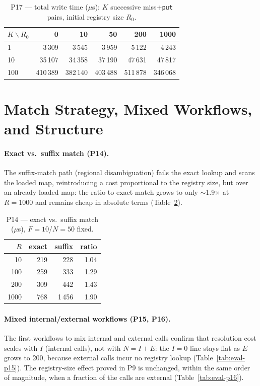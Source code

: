 \begin{table}[htbp]
  \centering
  \caption{P17 --- total write time ($\mu$s): $K$ successive miss+\texttt{put} pairs, initial
  registry size $R_0$.}
  \label{tab:eval-p17}
  \begin{tabular}{lrrrrr}
    \hline
    $K\backslash R_0$ & 0 & 10 & 50 & 200 & 1000 \\
    \hline
    1   & 3\,309   & 3\,545   & 3\,959   & 5\,122   & 4\,243   \\
    10  & 35\,107  & 34\,358  & 37\,190  & 47\,631  & 47\,817  \\
    100 & 410\,389 & 382\,140 & 403\,488 & 511\,878 & 346\,068 \\
    \hline
  \end{tabular}
\end{table}

\section{Match Strategy, Mixed Workflows, and Structure}
\label{sec:eval-secondary}

\paragraph{Exact vs.\ suffix match (P14).}
The suffix-match path (regional disambiguation) fails the exact lookup and scans the loaded map,
reintroducing a cost proportional to the registry size, but over an already-loaded map: the ratio
to exact match grows to only $\sim$1.9$\times$ at $R{=}1000$ and remains cheap in absolute terms
(Table~\ref{tab:eval-p14}).

\begin{table}[htbp]
  \centering
  \caption{P14 --- exact vs.\ suffix match ($\mu$s), $F{=}10$/$N{=}50$ fixed.}
  \label{tab:eval-p14}
  \begin{tabular}{rrrr}
    \hline
    \textbf{$R$} & \textbf{exact} & \textbf{suffix} & \textbf{ratio} \\
    \hline
    10   & 219 & 228   & 1.04 \\
    100  & 259 & 333   & 1.29 \\
    200  & 309 & 442   & 1.43 \\
    1000 & 768 & 1\,456 & 1.90 \\
    \hline
  \end{tabular}
\end{table}

\paragraph{Mixed internal/external workflows (P15, P16).}
The first workflows to mix internal and external calls confirm that resolution cost scales with
$I$ (internal calls), not with $N{=}I{+}E$: the $I{=}0$ line stays flat as $E$ grows to 200,
because external calls incur no registry lookup (Table~\ref{tab:eval-p15}). The registry-size
effect proved in P9 is unchanged, within the same order of magnitude, when a fraction of the
calls are external (Table~\ref{tab:eval-p16}).

